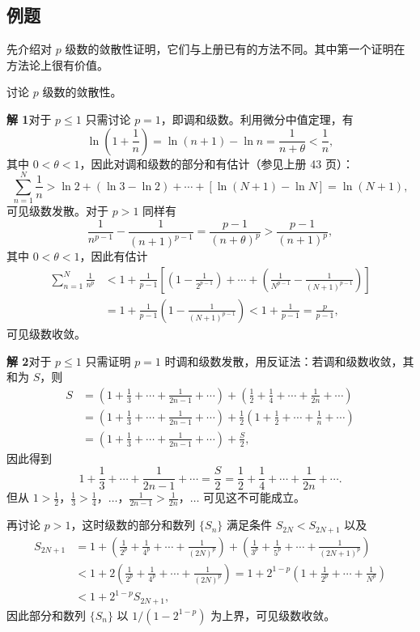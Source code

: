 \subsection{例题}

先介绍对 $p$ 级数的敛散性证明，它们与上册已有的方法不同。其中第一个证明在方法论上很有价值。

\begin{xexample}[13.2.1]
讨论 $p$ 级数的敛散性。
\end{xexample}
\begin{xsolution}
\textbf{解 1}\quad 对于 $p\leq1$ 只需讨论 $p=1$，即调和级数。利用微分中值定理，有
\[
\ln\left(1+\frac1n\right)=\ln(n+1)-\ln n=\frac1{n+\theta}<\frac1n,
\]
其中 $0<\theta<1$，因此对调和级数的部分和有估计（参见上册 43 页）：
\[
\sum_{n=1}^{N}\frac1n>\ln2+(\ln3-\ln2)+\cdots+[\ln(N+1)-\ln N]=\ln(N+1),
\]
可见级数发散。对于 $p>1$ 同样有
\[
\frac1{n^{p-1}}-\frac1{(n+1)^{p-1}}=\frac{p-1}{(n+\theta)^p}>\frac{p-1}{(n+1)^p},
\]
其中 $0<\theta<1$，因此有估计
\[
\begin{aligned}
\sum_{n=1}^{N}\frac1{n^p}
&<1+\frac1{p-1}\left[\left(1-\frac1{2^{p-1}}\right)+\cdots+\left(\frac1{N^{p-1}}-\frac1{(N+1)^{p-1}}\right)\right]\\
&=1+\frac1{p-1}\left(1-\frac1{(N+1)^{p-1}}\right)<1+\frac1{p-1}=\frac p{p-1},
\end{aligned}
\]
可见级数收敛。

\textbf{解 2}\quad 对于 $p\leq1$ 只需证明 $p=1$ 时调和级数发散，用反证法：若调和级数收敛，其和为 $S$，则
\[
\begin{aligned}
S&=\left(1+\frac13+\cdots+\frac1{2n-1}+\cdots\right)+\left(\frac12+\frac14+\cdots+\frac1{2n}+\cdots\right)\\
&=\left(1+\frac13+\cdots+\frac1{2n-1}+\cdots\right)+\frac12\left(1+\frac12+\cdots+\frac1n+\cdots\right)\\
&=\left(1+\frac13+\cdots+\frac1{2n-1}+\cdots\right)+\frac S2,
\end{aligned}
\]
因此得到
\[
1+\frac13+\cdots+\frac1{2n-1}+\cdots=\frac S2=\frac12+\frac14+\cdots+\frac1{2n}+\cdots.
\]
但从 $1>\frac12$，$\frac13>\frac14$，$\ldots$，$\frac1{2n-1}>\frac1{2n}$，$\ldots$ 可见这不可能成立。

再讨论 $p>1$，这时级数的部分和数列 $\{S_n\}$ 满足条件 $S_{2N}<S_{2N+1}$ 以及
\[
\begin{aligned}
S_{2N+1}&=1+\left(\frac1{2^p}+\frac1{4^p}+\cdots+\frac1{(2N)^p}\right)+\left(\frac1{3^p}+\frac1{5^p}+\cdots+\frac1{(2N+1)^p}\right)\\
&<1+2\left(\frac1{2^p}+\frac1{4^p}+\cdots+\frac1{(2N)^p}\right)
=1+2^{1-p}\left(1+\frac1{2^p}+\cdots+\frac1{N^p}\right)\\
&<1+2^{1-p}S_{2N+1},
\end{aligned}
\]
因此部分和数列 $\{S_n\}$ 以 $1/(1-2^{1-p})$ 为上界，可见级数收敛。
\end{xsolution}

